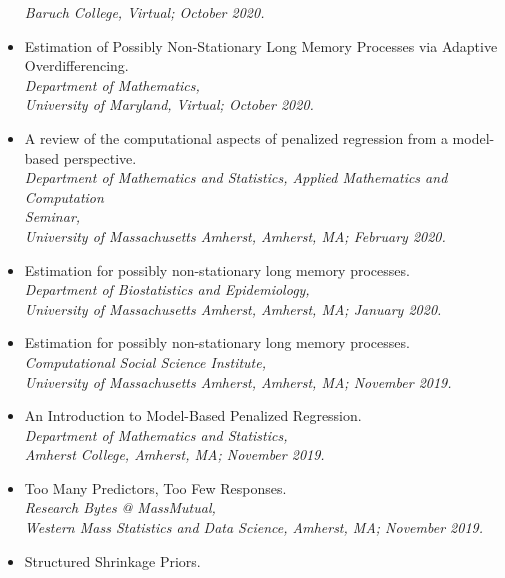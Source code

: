 \documentclass[11pt]{article}
\newcommand{\tab}{\hspace*{2em}}
\begin{document}
\begin{itemize}
	\tab \emph{Baruch College, Virtual; October 2020.} \vspace{-2mm}
	\item[] Estimation of Possibly Non-Stationary Long Memory Processes via Adaptive \\
	Overdifferencing. \\
	\tab \emph{Department of Mathematics,}\\ 
	\tab \emph{University of Maryland, Virtual; October 2020.} \vspace{-2mm}
	\item[] A review of the computational aspects of penalized regression from a model-based perspective. \\
	\tab \emph{Department of Mathematics and Statistics, Applied Mathematics and Computation} \\
	\tab \emph{Seminar,}\\ 
	\tab \emph{University of Massachusetts Amherst, Amherst, MA; February 2020.} \vspace{-2mm}
	\item[] Estimation for possibly non-stationary long memory processes. \\
	\tab \emph{Department of Biostatistics and Epidemiology,}\\ 
	\tab \emph{University of Massachusetts Amherst, Amherst, MA; January 2020.} \vspace{-2mm}
	\item[] Estimation for possibly non-stationary long memory processes. \\
	\tab \emph{Computational Social Science Institute,}\\ 
	\tab \emph{University of Massachusetts Amherst, Amherst, MA; November 2019.} \vspace{-2mm}
	\item[] An Introduction to Model-Based Penalized Regression. \\
	\tab \emph{Department of Mathematics and Statistics,}\\ 
	\tab \emph{Amherst College, Amherst, MA; November 2019.} \vspace{-2mm}
	\item[] Too Many Predictors, Too Few Responses. \\
	\tab \emph{Research Bytes @ MassMutual,}\\ 
	\tab \emph{Western Mass Statistics and Data Science, Amherst, MA; November 2019.} \vspace{-2mm}
	\item[] Structured Shrinkage Priors. \\

\end{itemize}
\end{document}
